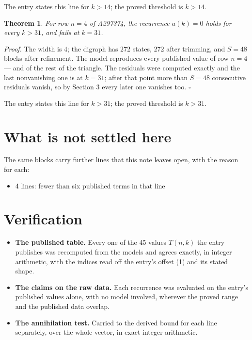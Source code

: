 \documentclass[11pt]{article}
\newtheorem{theorem}{Theorem}
\theoremstyle{definition}
\begin{document}
The entry states this line for $k > 14$; the proved threshold is $k > 14$.

\begin{theorem} For row $n = 4$ of A297374, the recurrence $a(k) = 0$ holds for every $k > 31$, and fails at $k = 31$.\end{theorem}

{\itshape Proof.} The width is $4$; the digraph has $272$ states, $272$ after trimming, and $S = 48$ blocks after refinement. The model reproduces every published value of row $n = 4$ --- and of the rest of the triangle. The residuals were computed exactly and the last nonvanishing one is at $k = 31$; after that point more than $S = 48$ consecutive residuals vanish, so by Section 3 every later one vanishes too. $\square$

The entry states this line for $k > 31$; the proved threshold is $k > 31$.

\section{What is not settled here}

The same blocks carry further lines that this note leaves open, with the reason for each:

\begin{itemize}

\item 4 lines: fewer than six published terms in that line

\end{itemize}

\section{Verification}

\begin{itemize}

\item {\bfseries The published table.} Every one of the 45 values $T(n,k)$ the entry publishes was recomputed from the models and agrees exactly, in integer arithmetic, with the indices read off the entry's offset (1) and its stated shape.

\item {\bfseries The claims on the raw data.} Each recurrence was evaluated on the entry's published values alone, with no model involved, wherever the proved range and the published data overlap.

\item {\bfseries The annihilation test.} Carried to the derived bound for each line separately, over the whole vector, in exact integer arithmetic.

\end{itemize}
\end{document}
